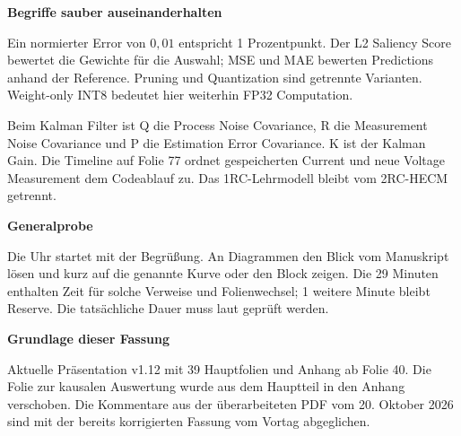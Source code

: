 \textbf{Begriffe sauber auseinanderhalten}\par
Ein normierter Error von $0{,}01$ entspricht 1 Prozentpunkt.
Der L2 Saliency Score bewertet die Gewichte für die Auswahl;
MSE und MAE bewerten Predictions anhand der Reference.
Pruning und Quantization sind getrennte Varianten.
Weight-only INT8 bedeutet hier weiterhin FP32 Computation.

Beim Kalman Filter ist Q die Process Noise Covariance, R die Measurement Noise
Covariance und P die Estimation Error Covariance. K ist der Kalman Gain.
Die Timeline auf Folie 77 ordnet gespeicherten Current und neue Voltage
Measurement dem Codeablauf zu. Das 1RC-Lehrmodell bleibt vom 2RC-HECM getrennt.

\textbf{Generalprobe}\par
Die Uhr startet mit der Begrüßung. An Diagrammen den Blick vom Manuskript
lösen und kurz auf die genannte Kurve oder den Block zeigen. Die 29 Minuten
enthalten Zeit für solche Verweise und Folienwechsel; 1 weitere Minute
bleibt Reserve. Die tatsächliche Dauer muss laut geprüft werden.

\textbf{Grundlage dieser Fassung}\par
Aktuelle Präsentation v1.12 mit 39 Hauptfolien und Anhang ab Folie 40.
Die Folie zur kausalen Auswertung wurde aus dem Hauptteil in den Anhang verschoben.
Die Kommentare aus der überarbeiteten PDF vom 20. Oktober 2026 sind
mit der bereits korrigierten Fassung vom Vortag abgeglichen.
